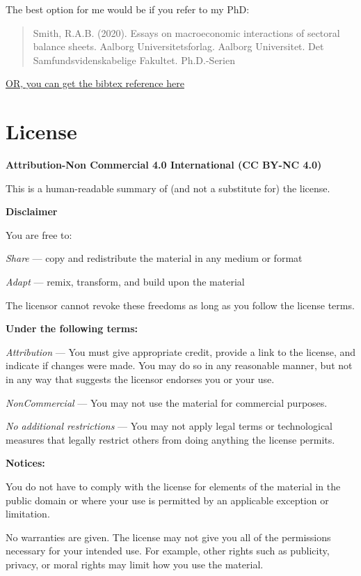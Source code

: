 \documentclass[
]{book}
\begin{document}
The best option for me would be if you refer to my PhD:

\begin{quote}
Smith, R.A.B. (2020). Essays on macroeconomic interactions of sectoral balance sheets. Aalborg Universitetsforlag. Aalborg Universitet. Det Samfundsvidenskabelige Fakultet. Ph.D.-Serien
\end{quote}

\href{https://vbn.aau.dk/en/publications/essays-on-macroeconomic-interactions-of-sectoral-balance-sheets}{OR, you can get the bibtex reference here}

\hypertarget{license}{%
\section{License}\label{license}}

\textbf{Attribution-Non Commercial 4.0 International (CC BY-NC 4.0)}

This is a human-readable summary of (and not a substitute for) the license.

\textbf{Disclaimer}

You are free to:

\emph{Share} --- copy and redistribute the material in any medium or format

\emph{Adapt} --- remix, transform, and build upon the material

The licensor cannot revoke these freedoms as long as you follow the license terms.

\textbf{Under the following terms:}

\emph{Attribution} --- You must give appropriate credit, provide a link to the license, and indicate if changes were made. You may do so in any reasonable manner, but not in any way that suggests the licensor endorses you or your use.

\emph{NonCommercial} --- You may not use the material for commercial purposes.

\emph{No additional restrictions} --- You may not apply legal terms or technological measures that legally restrict others from doing anything the license permits.

\textbf{Notices:}

You do not have to comply with the license for elements of the material in the public domain or where your use is permitted by an applicable exception or limitation.

No warranties are given. The license may not give you all of the permissions necessary for your intended use. For example, other rights such as publicity, privacy, or moral rights may limit how you use the material.
\end{document}
